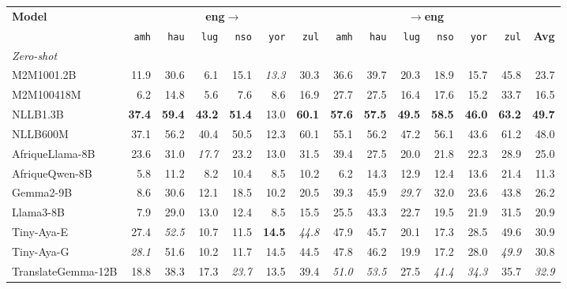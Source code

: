 \begin{table}[t]
\centering
\small
\renewcommand{\arraystretch}{1.05}
\begin{tabular}{lrrrrrrrrrrrrr}
\toprule
\textbf{Model} & \multicolumn{6}{c}{\textbf{eng$\to$}} & \multicolumn{6}{c}{\textbf{$\to$eng}} & \\
\cmidrule(lr){2-7}\cmidrule(lr){8-13}
   & \texttt{amh} & \texttt{hau} & \texttt{lug} & \texttt{nso} & \texttt{yor} & \texttt{zul} & \texttt{amh} & \texttt{hau} & \texttt{lug} & \texttt{nso} & \texttt{yor} & \texttt{zul} & \textbf{Avg} \\
\midrule
\multicolumn{14}{l}{\textit{Zero-shot}} \\
\midrule
M2M100\textunderscore{}1.2B & 11.9 & 30.6 & 6.1 & 15.1 & \emph{13.3} & 30.3 & 36.6 & 39.7 & 20.3 & 18.9 & 15.7 & 45.8 & 23.7 \\
M2M100\textunderscore{}418M & 6.2 & 14.8 & 5.6 & 7.6 & 8.6 & 16.9 & 27.7 & 27.5 & 16.4 & 17.6 & 15.2 & 33.7 & 16.5 \\
NLLB\textunderscore{}1.3B & \textbf{37.4} & \textbf{59.4} & \textbf{43.2} & \textbf{51.4} & 13.0 & \textbf{60.1} & \textbf{57.6} & \textbf{57.5} & \textbf{49.5} & \textbf{58.5} & \textbf{46.0} & \textbf{63.2} & \textbf{49.7} \\
NLLB\textunderscore{}600M & 37.1 & 56.2 & 40.4 & 50.5 & 12.3 & 60.1 & 55.1 & 56.2 & 47.2 & 56.1 & 43.6 & 61.2 & 48.0 \\
\midrule
AfriqueLlama-8B & 23.6 & 31.0 & \emph{17.7} & 23.2 & 13.0 & 31.5 & 39.4 & 27.5 & 20.0 & 21.8 & 22.3 & 28.9 & 25.0 \\
AfriqueQwen-8B & 5.8 & 11.2 & 8.2 & 10.4 & 8.5 & 10.2 & 6.2 & 14.3 & 12.9 & 12.4 & 13.6 & 21.4 & 11.3 \\
Gemma2-9B & 8.6 & 30.6 & 12.1 & 18.5 & 10.2 & 20.5 & 39.3 & 45.9 & \emph{29.7} & 32.0 & 23.6 & 43.8 & 26.2 \\
Llama3-8B & 7.9 & 29.0 & 13.0 & 12.4 & 8.5 & 15.5 & 25.5 & 43.3 & 22.7 & 19.5 & 21.9 & 31.5 & 20.9 \\
Tiny-Aya-E & 27.4 & \emph{52.5} & 10.7 & 11.5 & \textbf{14.5} & \emph{44.8} & 47.9 & 45.7 & 20.1 & 17.3 & 28.5 & 49.6 & 30.9 \\
Tiny-Aya-G & \emph{28.1} & 51.6 & 10.2 & 11.7 & 14.5 & 44.5 & 47.8 & 46.2 & 19.9 & 17.2 & 28.0 & \emph{49.9} & 30.8 \\
TranslateGemma-12B & 18.8 & 38.3 & 17.3 & \emph{23.7} & 13.5 & 39.4 & \emph{51.0} & \emph{53.5} & 27.5 & \emph{41.4} & \emph{34.3} & 35.7 & \emph{32.9} \\

\end{tabular}
\end{table}
